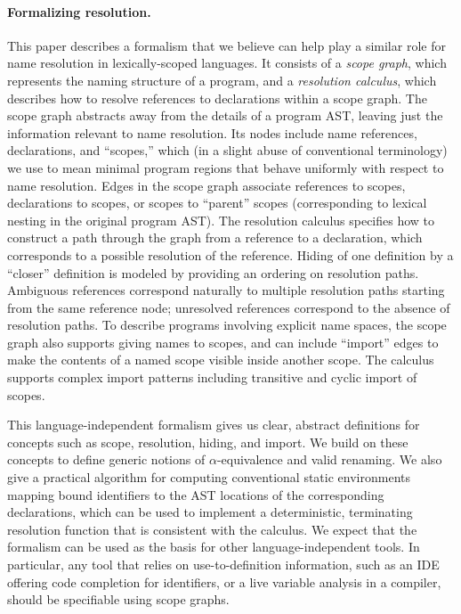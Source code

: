 \paragraph{Formalizing resolution.}\label{formalizing-resolution}
This paper describes a formalism that we believe can help play 
a similar role for name resolution in lexically-scoped languages. 
It consists of a
\emph{scope graph}, which represents the naming structure of a program,
and a \emph{resolution calculus}, which describes how to resolve
references to declarations within a scope graph. The scope graph
abstracts away from the details of a program AST, leaving just the
information relevant to name resolution. Its nodes include name
references, declarations, and ``scopes,'' which (in a slight abuse of
conventional terminology) we use to mean minimal program regions that
behave uniformly with respect to name resolution. 
Edges in the scope graph associate
references to scopes, declarations to scopes, or scopes to ``parent''
scopes (corresponding to lexical nesting in the original program AST).
The resolution calculus specifies how to construct a path through
the graph from a reference to a declaration, which corresponds to 
a possible resolution of the reference. Hiding of one definition
by a ``closer'' definition is modeled by providing
an ordering on resolution paths. Ambiguous references 
correspond naturally to multiple resolution paths starting
from the same reference node; unresolved references correspond
to the absence of resolution paths.  
To describe programs involving explicit name
spaces, the scope graph also supports giving names to scopes, and can
include ``import'' edges to make the contents of a named scope visible
inside another scope. The calculus supports complex import patterns including
transitive and cyclic import of scopes.

This language-independent formalism gives us clear, abstract definitions
for concepts such as scope, resolution, hiding, and import. 
We build on these concepts to define generic notions 
of $\alpha$-equivalence and valid renaming.  
We also give a practical algorithm for computing conventional
static environments mapping bound identifiers to the 
AST locations of the corresponding declarations,
which can be used to implement
a deterministic, terminating resolution function that is consistent 
with the calculus.  We expect that the formalism can be used 
as the basis for other language-independent tools. 
In particular, any tool that relies
on use-to-definition information, such as an IDE offering code completion for
identifiers, or a live variable analysis in a compiler, should
be specifiable using scope graphs.

